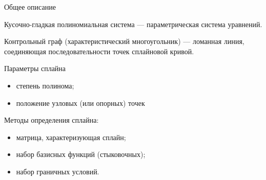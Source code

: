 \documentclass{beamer}
\begin{document}
	\begin{frame}{Общее описание}


		Кусочно-гладкая полиномиальная система --- параметрическая система уравнений.

		Контрольный граф (характеристический многоугольник) --- ломанная линия, соединяющая последовательности точек сплайновой кривой.

		Параметры сплайна
		\begin{itemize}
			\item степень полинома;
			\item положение узловых (или опорных) точек 
		\end{itemize}

		Методы определения сплайна:
		\begin{itemize}
			\item матрица, характеризующая сплайн;
			\item набор базисных функций (стыковочных);
			\item набор граничных условий.
		\end{itemize}


	\end{frame}
\end{document}
